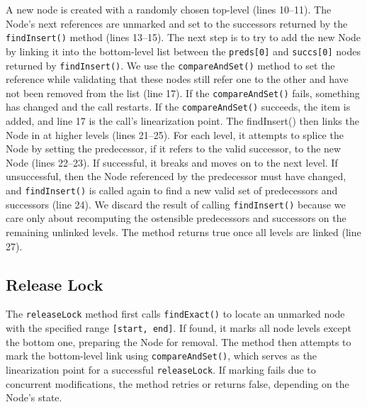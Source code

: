 A new node is created with a randomly chosen top-level (lines 10--11). 
The Node's next references are unmarked and set to the successors returned by the \texttt{findInsert()} method (lines 13--15).
The next step is to try to add the new Node by linking it into the bottom-level list between the \texttt{preds[0]} and \texttt{succs[0]} nodes returned by \texttt{findInsert()}. 
We use the \texttt{compareAndSet()} method to set the reference while validating that these nodes still refer one to the other and have not been removed from the list (line 17). 
If the  \texttt{compareAndSet()} fails, something has changed and the call restarts. 
If the  \texttt{compareAndSet()} succeeds, the item is added, and line 17 is the call's linearization point.
The {findInsert()} then links the Node in at higher levels (lines 21--25). 
For each level, it attempts to splice the Node by setting the predecessor, if it refers to the valid successor, to the new Node (lines 22--23). If successful, it breaks and moves on to the next level. 
If unsuccessful, then the Node referenced by the predecessor must have changed, and \texttt{findInsert()} is called again to find a new valid set of predecessors and successors (line 24). 
We discard the result of calling \texttt{findInsert()} because we care only about recomputing the ostensible predecessors and successors on the remaining unlinked levels. 
The method returns true once all levels are linked (line 27).

\subsection{Release Lock}\label{subsec:releaseLock}

The \texttt{releaseLock} method first calls \texttt{findExact()} to locate an unmarked node with the specified range \texttt{[start, end]}. 
If found, it marks all node levels except the bottom one, preparing the Node for removal. 
The method then attempts to mark the bottom-level link using \texttt{compareAndSet()}, which serves as the linearization point for a successful \texttt{releaseLock}. 
If marking fails due to concurrent modifications, the method retries or returns false, depending on the Node's state.

\vspace{15pt}
\begin{figure}[h]
    \centering
    
\end{figure}

